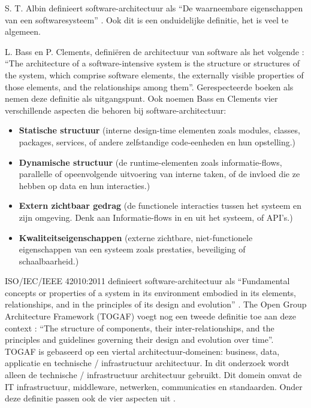 S. T. Albin definieert software-architectuur als \enquote{De waarneembare eigenschappen van een softwaresysteem} \parencite{ArtOfArchitecture}. Ook dit is een onduidelijke definitie, het is veel te algemeen.

L. Bass en P. Clements, definiëren de architectuur van software als het volgende \parencite{ArchitectureInPractice}: \enquote{The architecture of a software-intensive system is the structure or structures of the system, which comprise software elements, the externally visible properties of those elements, and the relationships among them}. Gerespecteerde boeken als \parencite{ArchitectureStakeholders, DesigningArchitectures} nemen deze definitie als uitgangspunt. Ook noemen Bass en Clements vier verschillende aspecten die behoren bij software-architectuur:
\begin{itemize}
	\item \textbf{Statische structuur} (interne design-time elementen zoals modules, classes, packages, services, of andere zelfstandige code-eenheden en hun opstelling.)
	\item \textbf{Dynamische structuur} (de runtime-elementen zoals informatie-flows, parallelle of opeenvolgende uitvoering van interne taken, of de invloed die ze hebben op data en hun interacties.)
	\item \textbf{Extern zichtbaar gedrag} (de functionele interacties tussen het systeem en zijn omgeving. Denk aan Informatie-flows in en uit het systeem, of API's.)
	\item \textbf{Kwaliteitseigenschappen} (externe zichtbare, niet-functionele eigenschappen van een systeem zoals prestaties, beveiliging of schaalbaarheid.)
\end{itemize}

ISO/IEC/IEEE 42010:2011 definieert software-architectuur als \enquote{Fundamental concepts or properties of a system in its environment embodied in its elements, relationships, and in the principles of its design and evolution} \parencite{IEEEArchitecture}. The Open Group Architecture Framework (TOGAF) voegt nog een tweede definitie toe aan deze context \parencite{ArchitectureTOGAF}: \enquote{The structure of components, their inter-relationships, and the principles and guidelines governing their design and evolution over time}. TOGAF is gebaseerd op een viertal architectuur-domeinen: business, data, applicatie en technische / infrastructuur architectuur. In dit onderzoek wordt alleen de technische / infrastructuur architectuur gebruikt. Dit domein omvat de IT infrastructuur, middleware, netwerken, communicaties en standaarden. Onder deze definitie passen ook de vier aspecten uit \parencite{ArchitectureInPractice}.
